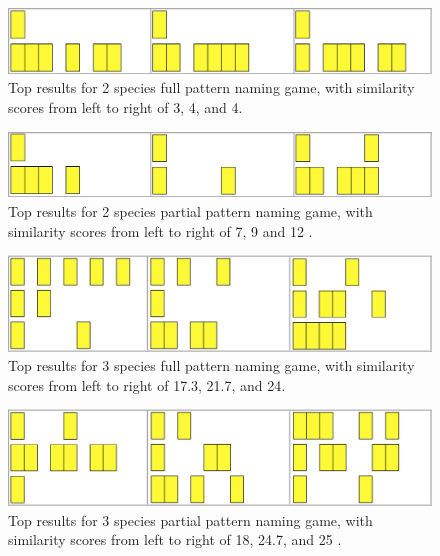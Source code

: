 
\begin{figure}[h]
\includegraphics[width = \columnwidth]{./pictures/2_lcs_one/all.png}
\caption{Top results for 2 species full pattern naming game, with similarity scores from left to right of 3, 4, and 4.}
\end{figure} 

\begin{figure}[h]
\includegraphics[width = \columnwidth]{./pictures/2_lcs_two/all.png}
\caption{Top results for 2 species partial pattern naming game, with similarity scores from left to right of 7, 9 and 12 .}
\end{figure} 

\begin{figure}[h]
\includegraphics[width = \columnwidth]{./pictures/3_lcs_one/all.png}
\caption{Top results for 3 species full pattern naming game, with similarity scores from left to right of 17.3, 21.7, and 24.}
\end{figure} 

\begin{figure}[h]
\includegraphics[width = \columnwidth]{./pictures/3_lcs_two/all.png}
\caption{Top results for 3 species partial pattern naming game, with similarity scores from left to right of 18, 24.7, and 25 .}
\end{figure} 

